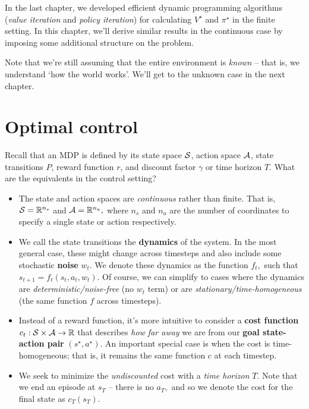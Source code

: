 \documentclass[../main/main]{subfiles}
\begin{document}
In the last chapter, we developed efficient dynamic programming algorithms (\emph{value iteration} and \emph{policy iteration})
for calculating $V^\star$ and $\pi^\star$ in the finite setting.
In this chapter, we'll derive similar results in the continuous case by imposing
some additional structure on the problem.

Note that we're still assuming that the entire environment is \emph{known} --
that is, we understand `how the world works'. We'll get to the unknown case in the next chapter.

\section{Optimal control}

Recall that an MDP is defined by its state space $\mathcal{S}$, action space $\mathcal{A}$, state transitions $P$, reward function $r$, and discount factor $\gamma$ or time horizon $T$. What are the equivalents in the control setting?

\begin{itemize}
    \item The state and action spaces are \emph{continuous} rather than finite. That is, $\mathcal{S} = \mathbb{R}^{n_s}$ and $\mathcal{A} = \mathbb{R}^{n_a},$ where $n_s$ and $n_a$ are the number of coordinates to specify a single state or action respectively.
    \item We call the state transitions the \textbf{dynamics} of the system. In the most general case, these might change across timesteps and also include some stochastic \textbf{noise} $w_t.$ We denote these dynamics as the function $f_t,$ such that $s_{t+1} = f_t(s_t, a_t, w_t).$ Of course, we can simplify to cases where the dynamics are \emph{deterministic/noise-free} (no $w_t$ term) or are \emph{stationary/time-homogeneous} (the same function $f$ across timesteps).
    \item Instead of a reward function, it's more intuitive to consider a \textbf{cost function} $c_t: \mathcal{S} \times \mathcal{A} \to \mathbb{R}$ that describes \emph{how far away} we are from our \textbf{goal state-action pair} $(s^\star, a^\star)$. An important special case is when the cost is time-homogeneous; that is, it remains the same function $c$ at each timestep.
    \item We seek to minimize the \emph{undiscounted} cost with a \emph{time horizon} $T$. Note that we end an episode at $s_T$ -- there is no $a_T,$ and so we denote the cost for the final state as $c_T(s_T).$
\end{itemize}
\end{document}

